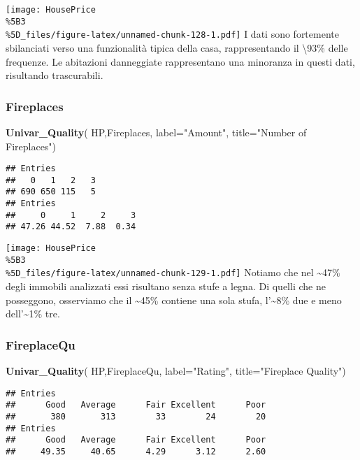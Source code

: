 \documentclass[
]{article}
\newenvironment{Shaded}{\begin{snugshade}}{\end{snugshade}}
\newcommand{\AttributeTok}[1]{\textcolor[rgb]{0.13,0.29,0.53}{#1}}
\newcommand{\FunctionTok}[1]{\textcolor[rgb]{0.13,0.29,0.53}{\textbf{#1}}}
\newcommand{\NormalTok}[1]{#1}
\newcommand{\StringTok}[1]{\textcolor[rgb]{0.31,0.60,0.02}{#1}}
\begin{document}
\texttt{[image: HousePrice\\\%5B3\\\%5D\_files/figure-latex/unnamed-chunk-128-1.pdf]}
I dati sono fortemente sbilanciati verso una funzionalità tipica della
casa, rappresentando il \textbackslash93\% delle frequenze. Le
abitazioni danneggiate rappresentano una minoranza in questi dati,
risultando trascurabili.

\subsubsection{Fireplaces}\label{fireplaces}

\begin{Shaded}
\begin{Highlighting}[]
\FunctionTok{Univar\_Quality}\NormalTok{(}
\NormalTok{  HP,Fireplaces,}
  \AttributeTok{label=}\StringTok{"Amount"}\NormalTok{,}
  \AttributeTok{title=}\StringTok{"Number of Fireplaces"}\NormalTok{)}
\end{Highlighting}
\end{Shaded}

\begin{verbatim}
## Entries
##   0   1   2   3 
## 690 650 115   5 
## Entries
##     0     1     2     3 
## 47.26 44.52  7.88  0.34
\end{verbatim}

\texttt{[image: HousePrice\\\%5B3\\\%5D\_files/figure-latex/unnamed-chunk-129-1.pdf]}
Notiamo che nel \textasciitilde47\% degli immobili analizzati essi
risultano senza stufe a legna. Di quelli che ne posseggono, osserviamo
che il \textasciitilde45\% contiene una sola stufa, l'\textasciitilde8\%
due e meno dell'\textasciitilde1\% tre.

\subsubsection{FireplaceQu}\label{fireplacequ}

\begin{Shaded}
\begin{Highlighting}[]
\FunctionTok{Univar\_Quality}\NormalTok{(}
\NormalTok{  HP,FireplaceQu,}
  \AttributeTok{label=}\StringTok{"Rating"}\NormalTok{,}
  \AttributeTok{title=}\StringTok{"Fireplace Quality"}\NormalTok{)}
\end{Highlighting}
\end{Shaded}

\begin{verbatim}
## Entries
##      Good   Average      Fair Excellent      Poor 
##       380       313        33        24        20 
## Entries
##      Good   Average      Fair Excellent      Poor 
##     49.35     40.65      4.29      3.12      2.60
\end{verbatim}
\end{document}
